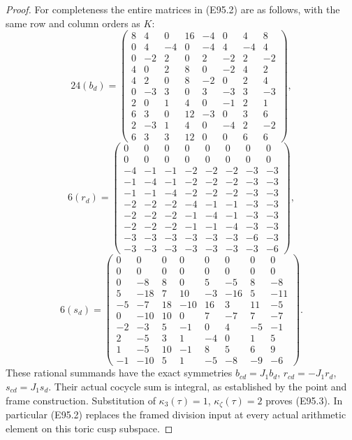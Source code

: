 \begin{proof}
For completeness the entire matrices in (E95.2) are
as follows, with the same row and column orders as $K$:
\[
24(b_d)=\begin{pmatrix}
8&4&0&16&-4&0&4&8\\0&4&-4&0&-4&4&-4&4\\
0&-2&2&0&2&-2&2&-2\\4&0&2&8&0&-2&4&2\\
4&2&0&8&-2&0&2&4\\0&-3&3&0&3&-3&3&-3\\
2&0&1&4&0&-1&2&1\\6&3&0&12&-3&0&3&6\\
2&-3&1&4&0&-4&2&-2\\6&3&3&12&0&0&6&6
\end{pmatrix},
 \tag{E95.29}
\]
\[
6(r_d)=\begin{pmatrix}
0&0&0&0&0&0&0&0\\0&0&0&0&0&0&0&0\\
-4&-1&-1&-2&-2&-2&-3&-3\\-1&-4&-1&-2&-2&-2&-3&-3\\
-1&-1&-4&-2&-2&-2&-3&-3\\-2&-2&-2&-4&-1&-1&-3&-3\\
-2&-2&-2&-1&-4&-1&-3&-3\\-2&-2&-2&-1&-1&-4&-3&-3\\
-3&-3&-3&-3&-3&-3&-6&-3\\-3&-3&-3&-3&-3&-3&-3&-6
\end{pmatrix},
 \tag{E95.30}
\]
\[
6(s_d)=\begin{pmatrix}
0&0&0&0&0&0&0&0\\0&0&0&0&0&0&0&0\\
0&-8&8&0&5&-5&8&-8\\5&-18&7&10&-3&-16&5&-11\\
-5&-7&18&-10&16&3&11&-5\\0&-10&10&0&7&-7&7&-7\\
-2&-3&5&-1&0&4&-5&-1\\2&-5&3&1&-4&0&1&5\\
1&-5&10&-1&8&5&6&9\\-1&-10&5&1&-5&-8&-9&-6
\end{pmatrix}.
 \tag{E95.31}
\]
These rational summands have the exact symmetries
$b_{cd}=J_1b_d$, $r_{cd}=-J_1r_d$, $s_{cd}=J_1s_d$.
Their actual cocycle sum is integral, as established
by the point and frame construction. Substitution of
$\kappa_3(\tau)=1$, $\kappa_\zeta(\tau)=2$ proves
(E95.3). In particular (E95.2) replaces the framed
division input at every actual arithmetic element
on this toric cusp subspace.


\end{proof}
